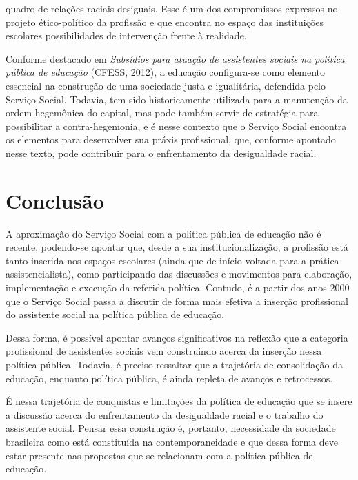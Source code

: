  quadro de relações raciais desiguais. Esse é um dos compromissos expressos no projeto
 ético-político da profissão e que encontra no espaço das instituições escolares
 possibilidades de intervenção frente à realidade.\par Conforme destacado em \textit{Subsídios para atuação de assistentes sociais na
 política pública de educação} (CFESS,
 2012), a educação configura-se como elemento essencial na construção de uma
 sociedade justa e igualitária, defendida pelo Serviço Social. Todavia, tem sido
 historicamente utilizada para a manutenção da ordem hegemônica do capital, mas pode
 também servir de estratégia para possibilitar a contra-hegemonia, e é nesse contexto
 que o Serviço Social encontra os elementos para desenvolver sua práxis profissional,
 que, conforme apontado nesse texto, pode contribuir para o enfrentamento da
 desigualdade racial.\section*{Conclusão}\par A aproximação do Serviço Social com a política pública de educação não é recente,
 podendo-se apontar que, desde a sua institucionalização, a profissão está tanto inserida
 nos espaços escolares (ainda que de início voltada para a prática assistencialista),
 como participando das discussões e movimentos para elaboração, implementação e execução
 da referida política. Contudo, é a partir dos anos 2000 que o Serviço Social passa a
 discutir de forma mais efetiva a inserção profissional do assistente social na política
 pública de educação.\par Dessa forma, é possível apontar avanços significativos na reflexão que a categoria
 profissional de assistentes sociais vem construindo acerca da inserção nessa política
 pública. Todavia, é preciso ressaltar que a trajetória de consolidação da educação,
 enquanto política pública, é ainda repleta de avanços e retrocessos.\par É nessa trajetória de conquistas e limitações da política de educação que se insere a
 discussão acerca do enfrentamento da desigualdade racial e o trabalho do assistente
 social. Pensar essa construção é, portanto, necessidade da sociedade brasileira como
 está constituída na contemporaneidade e que dessa forma deve estar presente nas
 propostas que se relacionam com a política pública de educação.
\balance
\pagebreak\onecolumn
